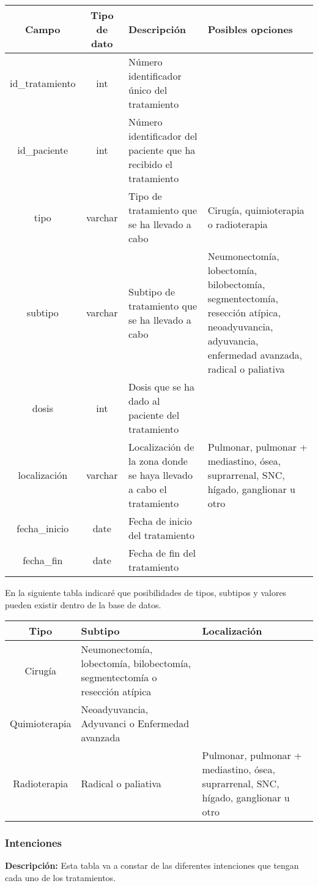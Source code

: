 \begin{longtable}{|c |c |p{4.6cm} |p{3.2cm} |}
\hline
Campo & Tipo de dato & Descripción & Posibles opciones\\ \hline
id\_tratamiento & int &  Número identificador único del tratamiento &\\\hline
id\_paciente & int & Número identificador del paciente que ha recibido el tratamiento &\\\hline
tipo & varchar & Tipo de tratamiento que se ha llevado a cabo & Cirugía, quimioterapia o	radioterapia\\\hline
subtipo & varchar & Subtipo de tratamiento que se ha llevado a cabo & Neumonectomía, lobectomía, bilobectomía, segmentectomía, resección atípica, neoadyuvancia, adyuvancia, enfermedad avanzada, radical o paliativa\\\hline
dosis & int & Dosis que se ha dado al paciente del tratamiento &\\\hline
localización & varchar & Localización de la zona donde se haya llevado a cabo el tratamiento& Pulmonar, pulmonar + mediastino,  ósea, suprarrenal, SNC, hígado, ganglionar u otro\\\hline
fecha\_inicio & date & Fecha de inicio del tratamiento&\\\hline
fecha\_fin & date & Fecha de fin del tratamiento&\\ \hline
\end{longtable}

En la siguiente tabla indicaré que posibilidades de tipos, subtipos y valores pueden existir dentro de la base de datos.

\begin{longtable}{|c |p{5cm} |p{5.7cm} |}
\hline
Tipo & Subtipo & Localización\\ \hline
Cirugía & Neumonectomía, lobectomía, bilobectomía, segmentectomía o resección atípica & \\ \hline
Quimioterapia & Neoadyuvancia, Adyuvanci o Enfermedad avanzada & \\ \hline
Radioterapia & Radical o paliativa & Pulmonar, pulmonar + mediastino,  ósea, suprarrenal, SNC, hígado, ganglionar u otro\\ \hline
\end{longtable}

\subsubsection{Intenciones}

\textbf{Descripción:} Esta tabla va a constar de las diferentes intenciones que tengan cada uno de los tratamientos.


